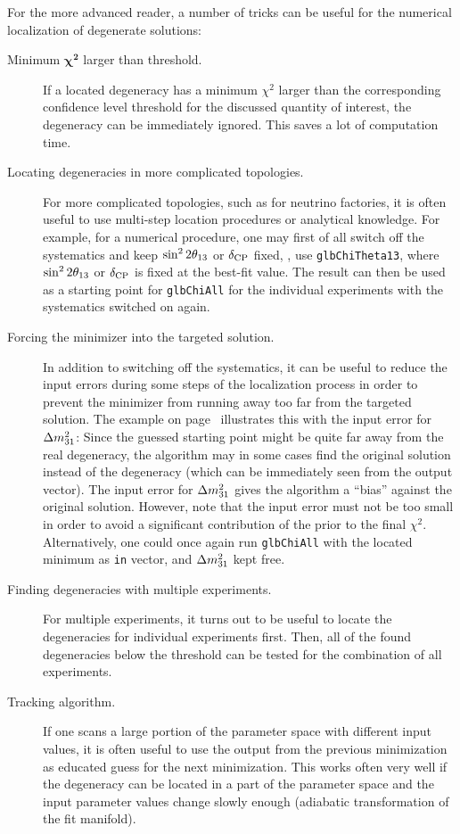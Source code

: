 For the more advanced reader, a number of tricks can be useful for the numerical localization of degenerate solutions:
\begin{description}
\item[Minimum $\boldsymbol{\chi^2}$ larger than threshold.] If a located degeneracy has a minimum $\chi^2$ larger than the corresponding confidence level threshold for the discussed quantity of interest, the degeneracy can be immediately ignored. This saves a lot of computation time.
\item[Locating degeneracies in more complicated topologies.] For more complicated topologies, such as for neutrino factories, it is often useful to use multi-step location procedures or analytical knowledge. For example, for a numerical procedure, one may first of all switch off the systematics and keep $\sin^2 2 \theta_{13}$ or $\delta_{\mathrm{CP}}$ fixed, \ie, use {\tt glbChiTheta13}, where $\sin^2 2 \theta_{13}$ or $\delta_{\mathrm{CP}}$ is fixed at the best-fit value. The result can then be used as a starting point for {\tt glbChiAll} for the individual experiments with the systematics switched on again. 
\item[Forcing the minimizer into the targeted solution.]
In addition to switching off the systematics, it can be useful to reduce the input errors during some steps of the localization process in order to prevent the minimizer from running away too far from the targeted solution.
The example on page~\pageref{ex:sgndeg} illustrates this with the
input error for $\Delta m_{31}^2$: Since the guessed starting point might be
quite far away from the real degeneracy, the algorithm may in some cases
find the original solution instead of the degeneracy (which can
be immediately seen from the output vector). The input error
for $\Delta m_{31}^2$ gives the algorithm a ``bias'' against the original solution.
However, note that the input error must not be too small in order
to avoid a significant contribution of the prior to the final $\chi^2$.
Alternatively, one could once again run {\tt glbChiAll} with the located 
minimum as {\tt in} vector, and $\Delta m_{31}^2$ kept free.
\item[Finding degeneracies with multiple experiments.] For multiple experiments, it turns out to be useful to locate the degeneracies for individual experiments first. Then, all of the found degeneracies below the threshold can be tested for the combination of all experiments.
\item[Tracking algorithm.] If one scans a large portion of the parameter space with different input values, it is often useful to use the output from the previous minimization as educated guess for the next minimization. This works often very well if the degeneracy can be located in a part of the parameter space and the input parameter values change slowly enough (adiabatic transformation of the fit manifold). 

\end{description}
